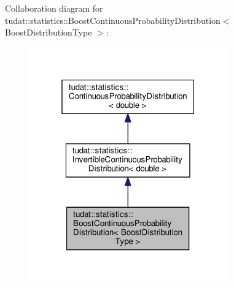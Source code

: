 Collaboration diagram for tudat\+:\+:statistics\+:\+:Boost\+Continuous\+Probability\+Distribution$<$ Boost\+Distribution\+Type $>$\+:
\nopagebreak
\begin{figure}[H]
\begin{center}
\leavevmode
\includegraphics[width=241pt]{classtudat_1_1statistics_1_1BoostContinuousProbabilityDistribution__coll__graph}
\end{center}
\end{figure}
